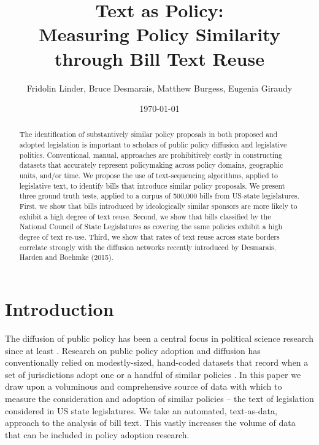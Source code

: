 \documentclass[12pt]{article} %
\begin{document}
 



\title{Text as Policy: \\ Measuring Policy Similarity through Bill Text Reuse}
\date{\today}
\author{Fridolin Linder, Bruce Desmarais, Matthew Burgess, Eugenia Giraudy}

\maketitle



\singlespacing
\begin{abstract} 
    \noindent The identification of substantively similar policy proposals in both proposed and adopted legislation is important to scholars of public policy diffusion and legislative politics. Conventional, manual, approaches are prohibitively costly in constructing datasets that accurately represent policymaking across policy domains, geographic units, and/or time. We propose the use of text-sequencing algorithms, applied to legislative text, to identify bills that introduce similar policy proposals. We present three ground truth tests, applied to a corpus of 500,000 bills from US-state legislatures. First, we show that bills introduced by ideologically similar sponsors are more likely to exhibit a high degree of text reuse. Second, we show that bills classified by the National Council of State Legislatures as covering the same policies exhibit a high degree of text re-use. Third, we show that rates of text reuse across state borders correlate strongly with the diffusion networks recently introduced by Desmarais, Harden and Boehmke (2015).

\end{abstract}


\doublespacing
\clearpage

\section{Introduction} The diffusion of public policy has been a central focus in political science research since at least \citet{walker1969}. Research on public policy adoption and diffusion has conventionally relied on modestly-sized, hand-coded datasets that record when a set of jurisdictions adopt one or a handful of similar policies \citep{boehmke2012}. In this paper we draw upon a voluminous and comprehensive source of data with which to measure the consideration and adoption of similar policies -- the text of legislation considered in US state legislatures. We take an automated, text-as-data, approach to the analysis of bill text. This vastly increases the volume of data that can be included in policy adoption research. 
\end{document}
